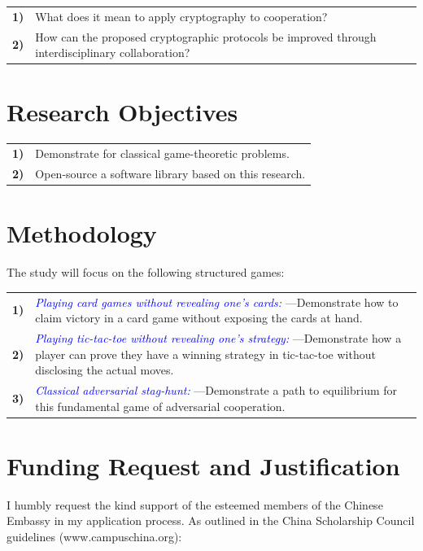 \documentclass[conference]{IEEEtran}
\begin{document}
\begin{tabular}{lp{210pt}}
    {\small \textbf{1)}} & {\small What does it mean to apply cryptography to cooperation?} \\
    {\small \textbf{2)}} & {\small How can the proposed cryptographic protocols be improved through interdisciplinary collaboration?}
\end{tabular}
    
\vspace{5pt}
\section{Research Objectives}

\begin{tabular}{lp{210pt}}
    {\small \textbf{1)}} & {\small Demonstrate for classical game-theoretic problems.} \\
    {\small \textbf{2)}} & {\small Open-source a software library based on this research.} 
\end{tabular}

\section{Methodology}
\vspace{5pt}
The study will focus on the following structured games:
\vspace{5pt}

\begin{tabular}{lp{210pt}}
    {\small \textbf{1)}} & {\textcolor{blue}{\textit{Playing card games without revealing one's cards:}} \linebreak---Demonstrate how to claim victory in a card game without exposing the cards at hand. } \\
    {\small \textbf{2)}} & {\textcolor{blue}{\textit{Playing tic-tac-toe without revealing one's strategy:}} \linebreak---Demonstrate how a player can prove they have a winning strategy in tic-tac-toe without disclosing the actual moves. } \\
    {\small \textbf{3)}} & {\textcolor{blue}{\textit{Classical adversarial stag-hunt:}} ---Demonstrate a path to equilibrium for this fundamental game of adversarial cooperation. } 
\end{tabular}

\section{Funding Request and Justification}
I humbly request the kind support of the esteemed members of the Chinese Embassy in my application process. 
As outlined in the China Scholarship Council guidelines (www.campuschina.org): 
\end{document}
